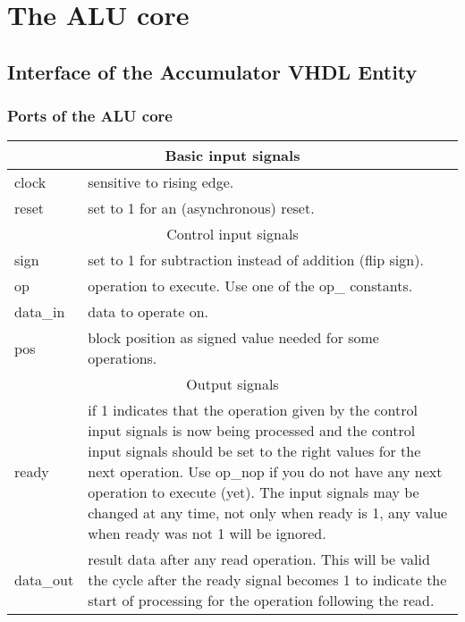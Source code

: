 \chapter{The ALU core}
\section{Interface of the Accumulator VHDL Entity}
\subsection{Ports of the ALU core}
\newcommand\tabhead[1]{\hline\multicolumn{2}{|c|}{#1}\\ \hline}
\newcommand\tabline[2]{#1 & #2\\ \hline}
\begin{center}
\begin{tabularx}{\textwidth}{|l|X|}
\tabhead     {Basic input signals}
\tabline {clock}     {sensitive to rising edge.}
\tabline {reset}     {set to 1 for an (asynchronous) reset.}
\hline
\tabhead     {Control input signals}
\tabline {sign}      {set to 1 for subtraction instead of addition (flip sign).}
\tabline {op}        {operation to execute. Use one of the op\_ constants.}
\tabline {data\_in}  {data to operate on.}
\tabline {pos}       {block position as signed value needed for some operations.}
\hline
\tabhead     {Output signals}
\tabline {ready}     {
        if 1 indicates that the operation given by the control input signals
        is now being processed and the control input signals should be set to
        the right values for the next operation.
        Use op\_nop if you do not have any next operation to execute (yet).
        The input signals may be changed at any time, not only when ready
        is 1, any value when ready was not 1 will be ignored.}
\tabline {data\_out} {
        result data after any read operation. This will be valid the
        cycle after the ready signal becomes 1 to indicate the start of
        processing for the operation following the read.}
\end{tabularx}
\end{center}


